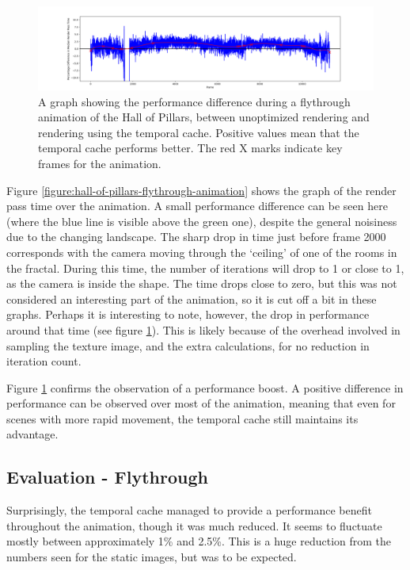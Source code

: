 \begin{figure}[ht]
	\centering
	\includegraphics[width=\linewidth, frame]{Images/Results/Hall-Of-Pillars-Flythrough-Animation-Gain.png}
	\caption{A graph showing the performance difference during a flythrough animation of the Hall of Pillars, between unoptimized rendering and rendering using the temporal cache. Positive values mean that the temporal cache performs better. The red X marks indicate key frames for the animation.}
	\label{figure:hall-of-pillars-flythrough-animation-gain}
\end{figure}

Figure \ref{figure:hall-of-pillars-flythrough-animation} shows the graph of the render pass time over the animation. A small performance difference can be seen here (where the blue line is visible above the green one), despite the general noisiness due to the changing landscape. The sharp drop in time just before frame 2000 corresponds with the camera moving through the `ceiling' of one of the rooms in the fractal. During this time, the number of iterations will drop to 1 or close to 1, as the camera is inside the shape. The time drops close to zero, but this was not considered an interesting part of the animation, so it is cut off a bit in these graphs. Perhaps it is interesting to note, however, the drop in performance around that time (see figure \ref{figure:hall-of-pillars-flythrough-animation-gain}). This is likely because of the overhead involved in sampling the texture image, and the extra calculations, for no reduction in iteration count.

Figure \ref{figure:hall-of-pillars-flythrough-animation-gain} confirms the observation of a performance boost. A positive difference in performance can be observed over most of the animation, meaning that even for scenes with more rapid movement, the temporal cache still maintains its advantage.

\subsection{Evaluation - Flythrough}

Surprisingly, the temporal cache managed to provide a performance benefit throughout the animation, though it was much reduced. It seems to fluctuate mostly between approximately 1\% and 2.5\%. This is a huge reduction from the numbers seen for the static images, but was to be expected.\newline

